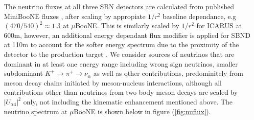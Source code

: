 \documentclass[11pt, a4paper]{article}
\begin{document}
The neutrino fluxes at all three SBN detectors are calculated from published MiniBooNE fluxes \cite{AguilarArevalo:2008yp}, after scaling by appropiate $1/r^2$ baseline dependance, e.g $(470/540)^2 \approx 1.3$ at $\mu$BooNE. This is similarly scaled by $1/r^2$ for ICARUS at 600m, however, an additional energy dependant flux modifier is applied for SBND at 110m to account for the softer energy spectrum due to the proximity of the detector to the production target \cite{Antonello:2015lea}. We consider sources of neutrinos that are dominant in at least one energy range including wrong sign neutrinos, smaller subdominant $K^+\rightarrow \pi^+\rightarrow \nu_\alpha$ as well as other contributions, predominitely from meson decay chains initiated by meson-nucleus interactions, although all contributions other than neutrinos from two body meson decays are scaled by $|U_{\alpha 4}|^2$ only, not including the kinematic enhancement mentioned above. The neutrino spectrum at $\mu$BooNE is shown below in figure (\ref{fig:nuflux}). 
\end{document}
